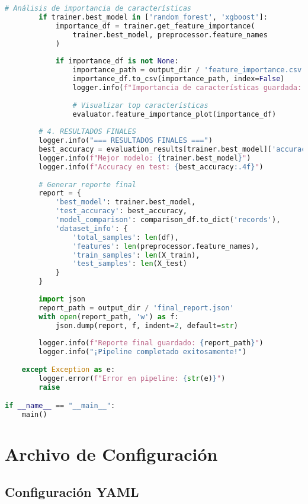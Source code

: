 \begin{lstlisting}[language=Python, caption=Script principal de ejecución]
        # Análisis de importancia de características
        if trainer.best_model in ['random_forest', 'xgboost']:
            importance_df = trainer.get_feature_importance(
                trainer.best_model, preprocessor.feature_names
            )
            
            if importance_df is not None:
                importance_path = output_dir / 'feature_importance.csv'
                importance_df.to_csv(importance_path, index=False)
                logger.info(f"Importancia de características guardada: {importance_path}")
                
                # Visualizar top características
                evaluator.feature_importance_plot(importance_df)
        
        # 4. RESULTADOS FINALES
        logger.info("=== RESULTADOS FINALES ===")
        best_accuracy = evaluation_results[trainer.best_model]['accuracy']
        logger.info(f"Mejor modelo: {trainer.best_model}")
        logger.info(f"Accuracy en test: {best_accuracy:.4f}")
        
        # Generar reporte final
        report = {
            'best_model': trainer.best_model,
            'test_accuracy': best_accuracy,
            'model_comparison': comparison_df.to_dict('records'),
            'dataset_info': {
                'total_samples': len(df),
                'features': len(preprocessor.feature_names),
                'train_samples': len(X_train),
                'test_samples': len(X_test)
            }
        }
        
        import json
        report_path = output_dir / 'final_report.json'
        with open(report_path, 'w') as f:
            json.dump(report, f, indent=2, default=str)
        
        logger.info(f"Reporte final guardado: {report_path}")
        logger.info("¡Pipeline completado exitosamente!")
        
    except Exception as e:
        logger.error(f"Error en pipeline: {str(e)}")
        raise

if __name__ == "__main__":
    main()
\end{lstlisting}

\section{Archivo de Configuración}

\subsection{Configuración YAML}

